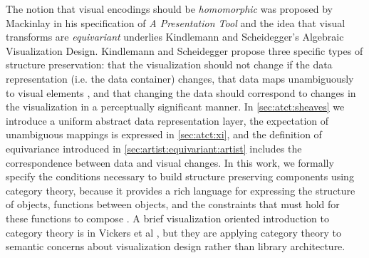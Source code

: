 \documentclass[10pt,journal,compsoc]{IEEEtran}
\theoremstyle{definition}
\theoremstyle{remark}
\begin{document}
The notion that visual encodings should be \textit{homomorphic} was proposed by Mackinlay\cite{mackinlayAutomaticDesignGraphical1987} in his specification of \textit{A Presentation Tool} and the idea that visual transforms are \textit{equivariant} underlies Kindlemann and Scheidegger\cite{kindlmannAlgebraicProcessVisualization2014}'s Algebraic Visualization Design. Kindlemann and Scheidegger propose three specific types of structure preservation: that the visualization should not change if the data representation (i.e. the data container) changes, that data maps unambiguously to visual elements \cite{ziemkiewiczEmbeddingInformationVisualization2009}, and that changing the data should correspond to changes in the visualization in a perceptually significant manner. In \autoref{sec:atct:sheaves} we introduce a uniform abstract data representation layer, the expectation of unambiguous mappings is expressed in \autoref{sec:atct:xi}, and the definition of equivariance introduced in \autoref{sec:artist:equivariant:artist} includes the correspondence between data and visual changes. In this work, we formally specify the conditions necessary to build structure preserving components using category theory, because it provides a rich language for expressing the structure of objects, functions between objects, and the constraints that must hold for these functions to compose \cite{wielsManagementEvolvingSpecifications1998,yorgeyMonoidsThemeVariations}. A brief visualization oriented introduction to category theory is in Vickers et al \cite{vickersUnderstandingVisualizationFormal2013}, but they are applying category theory to semantic concerns about visualization design rather than library architecture. 
\end{document}
